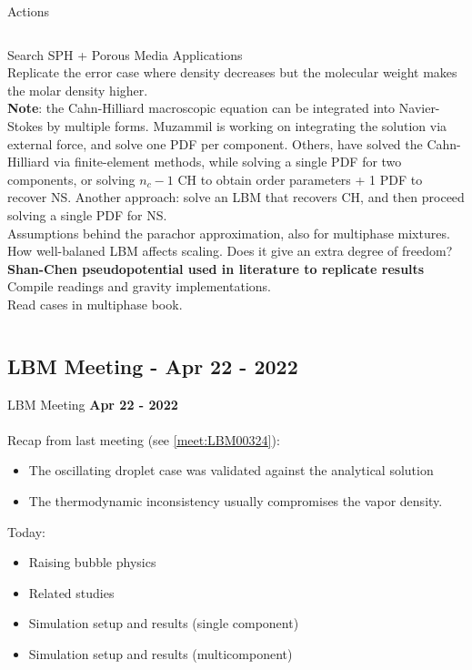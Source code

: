 \documentclass[8pt]{beamer}
\begin{document}
	\begin{frame}{Actions}
		\begin{columns}
			
			Search SPH + Porous Media Applications\\
			Replicate the error case where density decreases but the molecular weight makes the molar density higher.\\
			\textbf{Note}: the Cahn-Hilliard macroscopic equation can be integrated into Navier-Stokes by multiple forms. Muzammil is working on integrating the solution via external force, and solve one PDF per component. Others, have solved the Cahn-Hilliard via finite-element methods, while solving a single PDF for two components, or solving $n_c-1$ CH to obtain order parameters + 1 PDF to recover NS. Another approach: solve an LBM that recovers CH, and then proceed solving a single PDF for NS.\\
			
			Assumptions behind the parachor approximation, also for multiphase mixtures.\\
			How well-balaned LBM affects scaling. Does it give an extra degree of freedom?\\
			\textbf{Shan-Chen pseudopotential used in literature to replicate results}\\
			Compile readings and gravity implementations.\\
			Read cases in multiphase book.
			
			
		\end{columns}
	\end{frame}
	
	\subsection{LBM Meeting - Apr 22 - 2022}
	\label{meet:LBM00422}
	\justifying
	\begin{frame}{LBM Meeting}
		\textbf{Apr 22 - 2022}\\~\\
		Recap from last meeting (see \ref{meet:LBM00324}):
		\begin{itemize}
			\item The oscillating droplet case was validated against the analytical solution
			\item The thermodynamic inconsistency usually compromises the vapor density.
		\end{itemize}
		
		Today:
		\begin{itemize}
			\item Raising bubble physics
			\item Related studies
			\item Simulation setup and results (single component)
			\item Simulation setup and results (multicomponent)
		\end{itemize}
	\end{frame}
	
\end{document}
